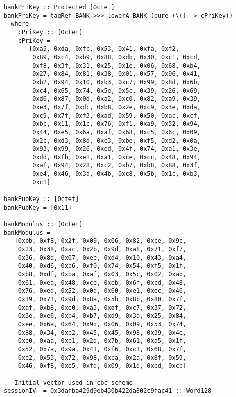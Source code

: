 \begin{Verbatim}[fontsize=\footnotesize,frame=lines,
                 framesep=5mm, label={[BankKey.hs]BankKey.hs}]
bankPriKey :: Protected [Octet]
bankPriKey = tagRef BANK >>> lowerA BANK (pure (\() -> cPriKey)) 
  where
    cPriKey :: [Octet]
    cPriKey =  
       [0xa5, 0xda, 0xfc, 0x53, 0x41, 0xfa, 0xf2,
        0x89, 0xc4, 0xb9, 0x88, 0xdb, 0x30, 0xc1, 0xcd,
        0xf8, 0x3f, 0x31, 0x25, 0x1e, 0x06, 0x68, 0xb4,
        0x27, 0x84, 0x81, 0x38, 0x01, 0x57, 0x96, 0x41,
        0xb2, 0x94, 0x10, 0xb3, 0xc7, 0x99, 0x8d, 0x6b,
        0xc4, 0x65, 0x74, 0x5e, 0x5c, 0x39, 0x26, 0x69,
        0xd6, 0x87, 0x0d, 0xa2, 0xc0, 0x82, 0xa9, 0x39,
        0xe3, 0x7f, 0xdc, 0xb8, 0x2e, 0xc9, 0x3e, 0xda,
        0xc9, 0x7f, 0xf3, 0xad, 0x59, 0x50, 0xac, 0xcf,
        0xbc, 0x11, 0x1c, 0x76, 0xf1, 0xa9, 0x52, 0x94,
        0x44, 0xe5, 0x6a, 0xaf, 0x68, 0xc5, 0x6c, 0x09,
        0x2c, 0xd3, 0x8d, 0xc3, 0xbe, 0xf5, 0xd2, 0x0a,
        0x93, 0x99, 0x26, 0xed, 0x4f, 0x74, 0xa1, 0x3e,
        0xdd, 0xfb, 0xe1, 0xa1, 0xce, 0xcc, 0x48, 0x94,
        0xaf, 0x94, 0x28, 0xc2, 0xb7, 0xb8, 0x88, 0x3f,
        0xe4, 0x46, 0x3a, 0x4b, 0xc8, 0x5b, 0x1c, 0xb3,
        0xc1]

bankPubKey :: [Octet]
bankPubKey = [0x11]

bankModulus :: [Octet]
bankModulus = 
   [0xbb, 0xf8, 0x2f, 0x09, 0x06, 0x82, 0xce, 0x9c,
    0x23, 0x38, 0xac, 0x2b, 0x9d, 0xa8, 0x71, 0xf7,
    0x36, 0x8d, 0x07, 0xee, 0xd4, 0x10, 0x43, 0xa4,
    0x40, 0xd6, 0xb6, 0xf0, 0x74, 0x54, 0xf5, 0x1f,
    0xb8, 0xdf, 0xba, 0xaf, 0x03, 0x5c, 0x02, 0xab,
    0x61, 0xea, 0x48, 0xce, 0xeb, 0x6f, 0xcd, 0x48,
    0x76, 0xed, 0x52, 0x0d, 0x60, 0xe1, 0xec, 0x46,
    0x19, 0x71, 0x9d, 0x8a, 0x5b, 0x8b, 0x80, 0x7f,
    0xaf, 0xb8, 0xe0, 0xa3, 0xdf, 0xc7, 0x37, 0x72,
    0x3e, 0xe6, 0xb4, 0xb7, 0xd9, 0x3a, 0x25, 0x84,
    0xee, 0x6a, 0x64, 0x9d, 0x06, 0x09, 0x53, 0x74,
    0x88, 0x34, 0xb2, 0x45, 0x45, 0x98, 0x39, 0x4e,
    0xe0, 0xaa, 0xb1, 0x2d, 0x7b, 0x61, 0xa5, 0x1f,
    0x52, 0x7a, 0x9a, 0x41, 0xf6, 0xc1, 0x68, 0x7f,
    0xe2, 0x53, 0x72, 0x98, 0xca, 0x2a, 0x8f, 0x59,
    0x46, 0xf8, 0xe5, 0xfd, 0x09, 0x1d, 0xbd, 0xcb]

-- Initial vector used in cbc scheme
sessionIV  = 0x3dafba429d9eb430b422da802c9fac41 :: Word128
\end{Verbatim}
